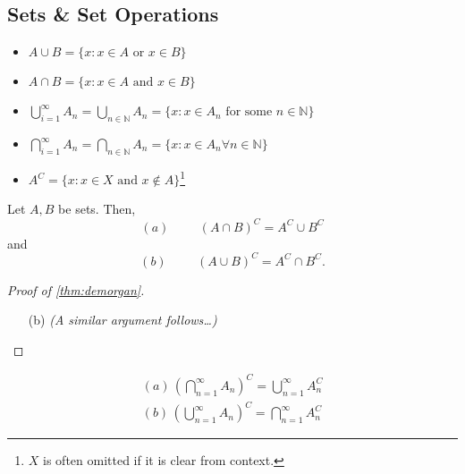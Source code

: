 \documentclass[12pt]{article}
\begin{document}


\subsection{Sets \& Set Operations}
\begin{itemize}
  \item $A \cup B = \{x : x \in A \text{ or } x \in B\}$
  \item $A \cap B = \{x : x \in A \text{ and } x \in B\}$
  \item $\bigcup_{i=1}^{\infty} A_n = \bigcup_{n \in \mathbb{N}} A_n = \{x : x \in A_n \text{ for some } n \in \mathbb{N}\}$
  \item $\bigcap_{i=1}^{\infty} A_n = \bigcap_{n \in \mathbb{N}} A_n = \{x : x \in A_n \forall n \in \mathbb{N}\}$
  \item $A^C = \{x : x\in X \text{ and } x \notin A\}$\footnote{$X$ is often omitted if it is clear from context.}
\end{itemize}

\begin{theorem}\label{thm:demorgan}
  Let $A, B$ be sets. Then,
  \[(a)\hspace{1cm}(A \cap B)^C = A^C \cup B^C\]and
  \[(b)\hspace{1cm}(A \cup B)^C = A^C \cap B^C.\]
\end{theorem}
\begin{proof}[Proof of \cref{thm:demorgan}]

\begin{itemize}
  \item[(b)] \emph{(A similar argument follows\dots)}
\end{itemize}
\end{proof}
\begin{proposition}\label{prop:demorgangen}
  \begin{align*}
    (a)\, \left(\bigcap_{n=1}^\infty A_n\right)^C = \bigcup_{n=1}^\infty A_n^C \\
    (b)\, \left(\bigcup_{n=1}^\infty A_n\right)^C = \bigcap_{n=1}^\infty A_n^C 
  \end{align*}
\end{proposition}
\end{document}
